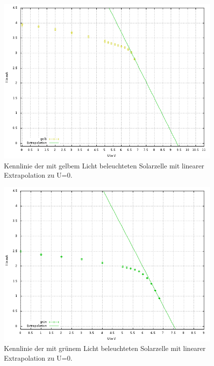 \begin{figure}
\includegraphics[scale=0.6]{Auswertung/gelb.png}
\caption{Kennlinie der mit gelbem Licht beleuchteten Solarzelle mit linearer Extrapolation zu U=0.\label{gelb}}
\end{figure}\begin{figure}
\includegraphics[scale=0.6]{Auswertung/gruen.png}
\caption{Kennlinie der mit grünem Licht beleuchteten Solarzelle mit linearer Extrapolation zu U=0.\label{gruen}}
\end{figure}\begin{figure}

\end{figure}
